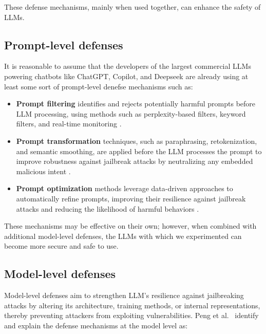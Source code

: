These defense mechanisms, mainly when used together, can enhance the safety of LLMs.

\subsection{Prompt-level defenses}

It is reasonable to assume that the developers of the largest commercial LLMs powering chatbots like ChatGPT, Copilot, and Deepseek are already using at least some sort of prompt-level denefse mechanisms such as:

\begin{itemize}
    \item \textbf{Prompt filtering} identifies and rejects potentially harmful prompts before LLM processing, using methods such as perplexity-based filters, keyword filters, and real-time monitoring \cite{peng2025jailbreakingmitigationvulnerabilitieslarge}.
    \item \textbf{Prompt transformation} techniques, such as paraphrasing, retokenization, and semantic smoothing, are applied before the LLM processes the prompt to improve robustness against jailbreak attacks by neutralizing any embedded malicious intent \cite{peng2025jailbreakingmitigationvulnerabilitieslarge}.
    \item \textbf{Prompt optimization} methods leverage data-driven approaches to automatically refine prompts, improving their resilience against jailbreak attacks and reducing the likelihood of harmful behaviors \cite{peng2025jailbreakingmitigationvulnerabilitieslarge}.
\end{itemize}

These mechanisms may be effective on their own; however, when combined with additional model-level defenses, the LLMs with which we experimented can become more secure and safe to use.

\subsection{Model-level defenses}

Model-level defenses aim to strengthen LLM's resilience against jailbreaking attacks by altering its architecture, training methods, or internal representations, thereby preventing attackers from exploiting vulnerabilities. Peng et al.~\cite{peng2025jailbreakingmitigationvulnerabilitieslarge} identify and explain the defense mechanisms at the model level as:

